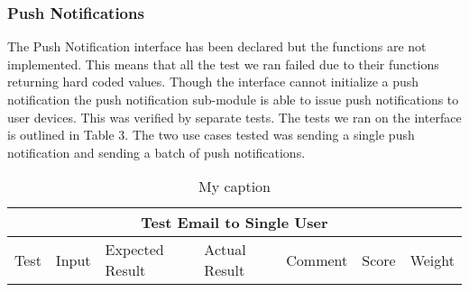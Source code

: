 \documentclass[11pt]{article}
\begin{document}
	\subsubsection{Push Notifications}
	The Push Notification interface has been declared but the functions are not implemented. This means that all the test we ran failed due to their functions returning hard coded values. Though the interface cannot initialize a push notification the push notification sub-module is able to issue push notifications to user devices. This was verified by separate tests. The tests we ran on the interface is outlined in Table 3. The two use cases tested was sending a single push notification and sending a batch of push notifications.
	\begin{sidewaystable}
        \centering
        \caption{My caption}
        \label{my-label}
        \begin{tabular}{lllllrr}
        \multicolumn{7}{c}{\textbf{Test Email to Single User}}                                                                                                                                                                                                                                                                                                                                                                                                                                                                                                                                                                                                                                                                                                                                         \\ \hline
        \multicolumn{1}{|l|}{Test}                                                                                                     & \multicolumn{1}{l|}{Input}                                                                                                                                                & \multicolumn{1}{l|}{Expected Result}                                                                       & \multicolumn{1}{l|}{Actual Result}                                                                         & \multicolumn{1}{l|}{Comment}                                                                                                                                                                 & \multicolumn{1}{l|}{Score} & \multicolumn{1}{l|}{Weight} \\ \hline

\end{tabular}
\end{sidewaystable}
\end{document}
